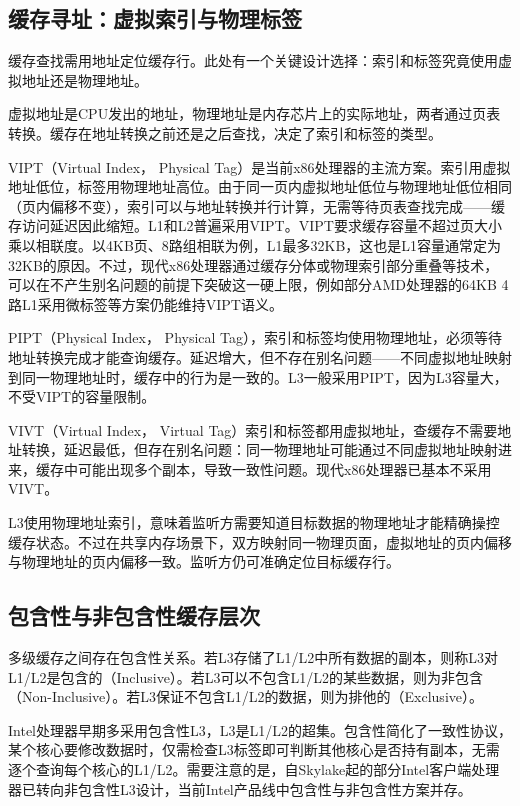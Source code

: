 \subsection{缓存寻址：虚拟索引与物理标签}

缓存查找需用地址定位缓存行。此处有一个关键设计选择：索引和标签究竟使用虚拟地址还是物理地址。

虚拟地址是CPU发出的地址，物理地址是内存芯片上的实际地址，两者通过页表转换。缓存在地址转换之前还是之后查找，决定了索引和标签的类型。

VIPT（Virtual Index， Physical Tag）是当前x86处理器的主流方案。索引用虚拟地址低位，标签用物理地址高位。由于同一页内虚拟地址低位与物理地址低位相同（页内偏移不变），索引可以与地址转换并行计算，无需等待页表查找完成——缓存访问延迟因此缩短。L1和L2普遍采用VIPT。VIPT要求缓存容量不超过页大小乘以相联度。以4KB页、8路组相联为例，L1最多32KB，这也是L1容量通常定为32KB的原因。不过，现代x86处理器通过缓存分体或物理索引部分重叠等技术，可以在不产生别名问题的前提下突破这一硬上限，例如部分AMD处理器的64KB 4路L1采用微标签等方案仍能维持VIPT语义。

PIPT（Physical Index， Physical Tag），索引和标签均使用物理地址，必须等待地址转换完成才能查询缓存。延迟增大，但不存在别名问题——不同虚拟地址映射到同一物理地址时，缓存中的行为是一致的。L3一般采用PIPT，因为L3容量大，不受VIPT的容量限制。

VIVT（Virtual Index， Virtual Tag）索引和标签都用虚拟地址，查缓存不需要地址转换，延迟最低，但存在别名问题：同一物理地址可能通过不同虚拟地址映射进来，缓存中可能出现多个副本，导致一致性问题。现代x86处理器已基本不采用VIVT。

L3使用物理地址索引，意味着监听方需要知道目标数据的物理地址才能精确操控缓存状态。不过在共享内存场景下，双方映射同一物理页面，虚拟地址的页内偏移与物理地址的页内偏移一致。监听方仍可准确定位目标缓存行。

\subsection{包含性与非包含性缓存层次}

多级缓存之间存在包含性关系。若L3存储了L1/L2中所有数据的副本，则称L3对L1/L2是包含的（Inclusive）。若L3可以不包含L1/L2的某些数据，则为非包含（Non-Inclusive）。若L3保证不包含L1/L2的数据，则为排他的（Exclusive）。

Intel处理器早期多采用包含性L3，L3是L1/L2的超集。包含性简化了一致性协议，某个核心要修改数据时，仅需检查L3标签即可判断其他核心是否持有副本，无需逐个查询每个核心的L1/L2。需要注意的是，自Skylake起的部分Intel客户端处理器已转向非包含性L3设计，当前Intel产品线中包含性与非包含性方案并存。

